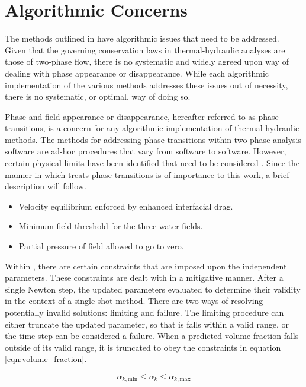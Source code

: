 \section{Algorithmic Concerns}
\label{sect:algorithmic_concerns}

The methods outlined in  have algorithmic issues that need to be addressed.
Given that the governing conservation laws in thermal-hydraulic analyses are those of two-phase flow, there is no systematic and widely agreed upon way of dealing with phase appearance or disappearance.
While each algorithmic implementation of the various methods addresses these issues out of necessity, there is no systematic, or optimal, way of doing so. 

Phase and field appearance or disappearance, hereafter referred to as phase transitions, is a concern for any algorithmic implementation of thermal hydraulic methods.
The methods for addressing phase transitions within two-phase analysis software are ad-hoc procedures that vary from software to software.
However, certain physical limits have been identified that need to be considered \cite{Bestion2000}.
Since the manner in which \cobra{} treats phase transitions is of importance to this work, a brief description will follow.

\begin{itemize}
\item{Velocity equilibrium enforced by enhanced interfacial drag.}
\item{Minimum field threshold for the three water fields.}
\item{Partial pressure of \ncg field allowed to go to zero.}
\end{itemize}

Within \cobra{}, there are certain constraints that are imposed upon the independent parameters.
These constraints are dealt with in a mitigative manner.
After a single Newton step, the updated parameters evaluated to determine their validity in the context of a single-shot method.
There are two ways of resolving potentially invalid solutions: limiting and failure.
The limiting procedure can either truncate the updated parameter, so that is falls within a valid range, or the time-step can be considered a failure.
When a predicted volume fraction falls outside of its valid range, it is truncated to obey the constraints in equation \eqref{eqn:volume_fraction}.

\begin{equation}
\label{eqn:volume_fraction}
\alpha_{k,\text{min}} \leq \alpha_k \leq \alpha_{k,\text{max}} 
\end{equation}

